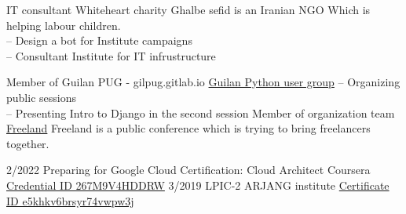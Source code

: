 \documentclass[9pt]{developercv}
\begin{document}
\begin{entrylist}
	\entrytwocol
	{IT consultant}
	{Whiteheart charity}
	{Ghalbe sefid is an Iranian NGO Which is helping labour children. \\
		-- Design a bot for Institute campaigns \\
		-- Consultant Institute for IT infrustructure}

	\entrytwocol
	{Member of Guilan PUG - gilpug.gitlab.io}
	{
		{{\href{https://www.instagram.com/p/B89LgJhlW_N/}{Guilan Python user group}}}
	}
	{
		-- Organizing public sessions \\
		-- Presenting Intro to Django in the second session
	}
	\entrytwocol
	{Member of organization team}
	{{{\href{https://freelanday.ir/}{Freeland}}}}
	{Freeland is a public conference which is trying to bring freelancers together.}
\end{entrylist}



\begin{entrylist}
	\entry
	{2/2022}
	{Preparing for Google Cloud Certification: Cloud Architect}
	{Coursera}
	{{\href{https://www.coursera.org/account/accomplishments/professional-cert/267M9V4HDDRW}{Credential ID 267M9V4HDDRW}}}
	\entry
	{3/2019}
	{LPIC-2}
	{ARJANG institute}
	{{\href{''}{Certificate ID e5khkv6brsyr74vwpw3j}}}

\end{entrylist}
\end{document}
